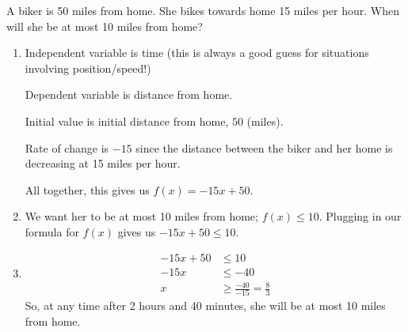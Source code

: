 \documentclass{article}
\begin{document}
\begin{example}{}{}
    A biker is 50 miles from home. She bikes towards home 15 miles per hour. When will she be at most 10 miles from home? 
\end{example}

\begin{solution}
    \begin{enumerate}
        \item Independent variable is time (this is always a good guess for situations involving position/speed!)
        
        Dependent variable is distance from home.

        Initial value is initial distance from home, $50$ (miles).

        Rate of change is $-15$ since the distance between the biker and her home is decreasing at 15 miles per hour.

        All together, this gives us $f(x)=-15x+50$.
        \item We want her to be at most 10 miles from home; $f(x)\leq 10$. Plugging in our formula for $f(x)$ gives us $-15x+50\leq 10$.
        \item \begin{align*}
            -15x+50&\leq 10\\
            -15x&\leq-40\\
            x&\geq\frac{-40}{-15}=\frac{8}{3}
        \end{align*}
        So, at any time after 2 hours and 40 minutes, she will be at most 10 miles from home.
    \end{enumerate}
\end{solution}
\end{document}
